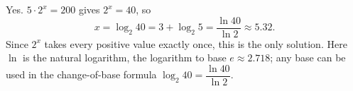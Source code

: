 Yes. $5\cdot2^x=200$ gives $2^x=40$, so
\[x=\log_2 40=3+\log_2 5=\dfrac{\ln40}{\ln2}\approx5.32.\]
Since $2^x$ takes every positive value exactly once, this is the only solution. Here $\ln$ is the natural logarithm, the logarithm to base $e\approx2.718$; any base can be used in the change-of-base formula $\log_2 40=\dfrac{\ln40}{\ln2}$.
